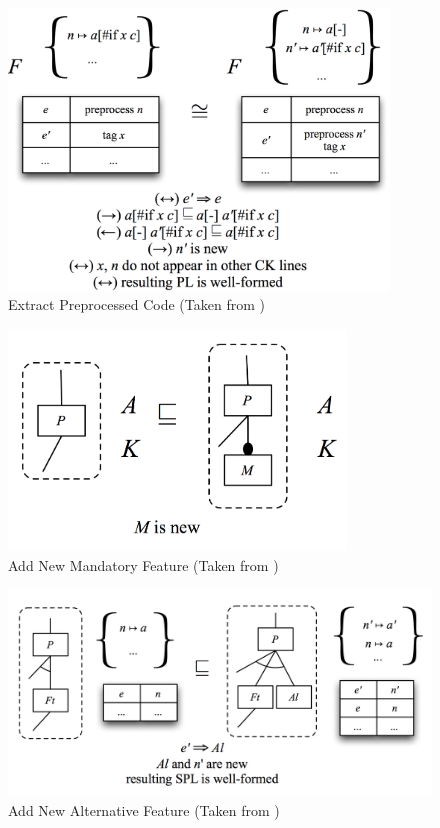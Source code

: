 \documentclass[12pt]{article}
\begin{document}
\begin{figure}[H]
\centering
\includegraphics[width=0.9\textwidth, frame]{images/Template5T}
\caption{Extract Preprocessed Code (Taken from \cite{twiki})}
\end{figure}

\begin{figure}[H]
\centering
\includegraphics[width=0.8\textwidth, frame]{images/TemplateAddNewMandatory}
\caption{Add New Mandatory Feature (Taken from \cite{twiki})}
\end{figure}

\begin{figure}[H]
\centering
\includegraphics[width=1\textwidth, frame]{images/TemplateAddNewAlternative}
\caption{Add New Alternative Feature (Taken from \cite{twiki})}
\end{figure}
\end{document}
